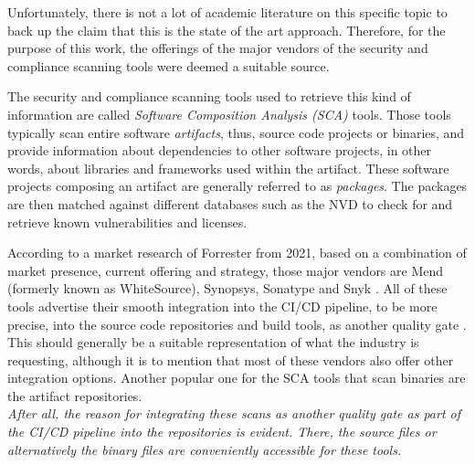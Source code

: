 Unfortunately, there is not a lot of academic literature on this specific topic to back up the claim that this is the state of the art approach. Therefore, for the purpose of this work, the offerings of the major vendors of the security and compliance scanning tools were deemed a suitable source.\par
The security and compliance scanning tools used to retrieve this kind of information are called \emph{Software Composition Analysis (SCA)} tools. Those tools typically scan entire software \emph{artifacts}, thus, source code projects or binaries, and provide information about dependencies to other software projects, in other words, about libraries and frameworks used within the artifact. These software projects composing an artifact are generally referred to as \emph{packages}. The packages are then matched against different databases such as the NVD to check for and retrieve known vulnerabilities and licenses.\par
According to a market research of Forrester from 2021, based on a combination of market presence, current offering and strategy, those major vendors are Mend (formerly known as WhiteSource), Synopsys, Sonatype and Snyk \cite{ForresterSCA}. All of these tools advertise their smooth integration into the CI/CD pipeline, to be more precise, into the source code repositories and build tools, as another quality gate \cite{MendIntegration, BDBAIntegration, SonatypeIntegration, SnykIntegration}. This should generally be a suitable representation of what the industry is requesting, although it is to mention that most of these vendors also offer other integration options. Another popular one for the SCA tools that scan binaries are the artifact repositories.\\

\emph{After all, the reason for integrating these scans as another quality gate as part of the CI/CD pipeline into the repositories is evident.  There, the source files or alternatively the binary files are conveniently accessible for these tools.}

